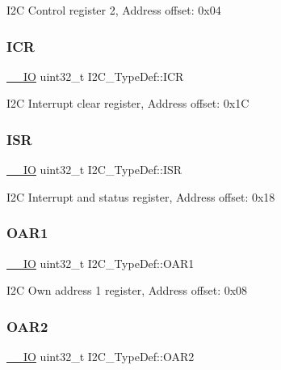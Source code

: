 I2C Control register 2, Address offset\+: 0x04 \mbox{\label{struct_i2_c___type_def_a790a1957ec69244915a9637f7d925cf7}} 
\subsubsection{\texorpdfstring{ICR}{ICR}}
{\footnotesize\ttfamily \mbox{\hyperlink{core__sc300_8h_aec43007d9998a0a0e01faede4133d6be}{\+\_\+\+\_\+\+IO}} uint32\+\_\+t I2\+C\+\_\+\+Type\+Def\+::\+I\+CR}

I2C Interrupt clear register, Address offset\+: 0x1C \mbox{\label{struct_i2_c___type_def_a0f73f2b049d95841c54313f0cc949afe}} 
\subsubsection{\texorpdfstring{ISR}{ISR}}
{\footnotesize\ttfamily \mbox{\hyperlink{core__sc300_8h_aec43007d9998a0a0e01faede4133d6be}{\+\_\+\+\_\+\+IO}} uint32\+\_\+t I2\+C\+\_\+\+Type\+Def\+::\+I\+SR}

I2C Interrupt and status register, Address offset\+: 0x18 \mbox{\label{struct_i2_c___type_def_ae8269169fcbdc2ecb580208d99c2f89f}} 
\subsubsection{\texorpdfstring{OAR1}{OAR1}}
{\footnotesize\ttfamily \mbox{\hyperlink{core__sc300_8h_aec43007d9998a0a0e01faede4133d6be}{\+\_\+\+\_\+\+IO}} uint32\+\_\+t I2\+C\+\_\+\+Type\+Def\+::\+O\+A\+R1}

I2C Own address 1 register, Address offset\+: 0x08 \mbox{\label{struct_i2_c___type_def_a73988a218be320999c74a641b3d6e3c1}} 
\subsubsection{\texorpdfstring{OAR2}{OAR2}}
{\footnotesize\ttfamily \mbox{\hyperlink{core__sc300_8h_aec43007d9998a0a0e01faede4133d6be}{\+\_\+\+\_\+\+IO}} uint32\+\_\+t I2\+C\+\_\+\+Type\+Def\+::\+O\+A\+R2}


